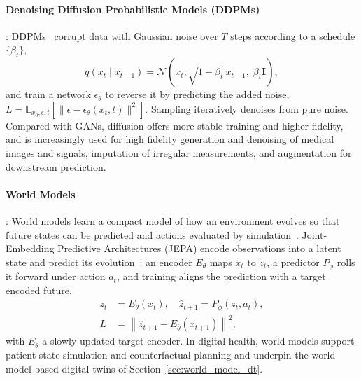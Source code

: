 \documentclass[journal]{IEEEtran}
\begin{document}
\paragraph{Denoising Diffusion Probabilistic Models (DDPMs)}: DDPMs~\cite{ho2020ddpm} corrupt data with Gaussian noise over $T$ steps according to a schedule $\{\beta_t\}$,
\begin{equation}
q(x_t \mid x_{t-1}) = \mathcal{N}\!\left(x_t; \sqrt{1-\beta_t}\, x_{t-1}, \; \beta_t \mathbf{I}\right),
\end{equation}
and train a network $\epsilon_\theta$ to reverse it by predicting the added noise, $L = \mathbb{E}_{x_0,\epsilon,t}[\|\epsilon - \epsilon_\theta(x_t,t)\|^2]$. Sampling iteratively denoises from pure noise. Compared with GANs, diffusion offers more stable training and higher fidelity, and is increasingly used for high fidelity generation and denoising of medical images and signals, imputation of irregular measurements, and augmentation for downstream prediction.

\paragraph{World Models}: World models learn a compact model of how an environment evolves so that future states can be predicted and actions evaluated by simulation~\cite{ha2018worldmodels}. Joint-Embedding Predictive Architectures (JEPA) encode observations into a latent state and predict its evolution~\cite{lecun2022jepa,maes2026leworldmodel}: an encoder $E_\theta$ maps $x_t$ to $z_t$, a predictor $P_\phi$ rolls it forward under action $a_t$, and training aligns the prediction with a target encoded future,
\begin{equation}
\begin{aligned}
z_t &= E_\theta(x_t), \quad \hat{z}_{t+1} = P_\phi(z_t, a_t),\\
L &= \left\| \hat{z}_{t+1} - E_{\bar{\theta}}(x_{t+1}) \right\|^2,
\end{aligned}
\end{equation}
with $E_{\bar{\theta}}$ a slowly updated target encoder. In digital health, world models support patient state simulation and counterfactual planning and underpin the world model based digital twins of Section~\ref{sec:world_model_dt}.



\end{document}

